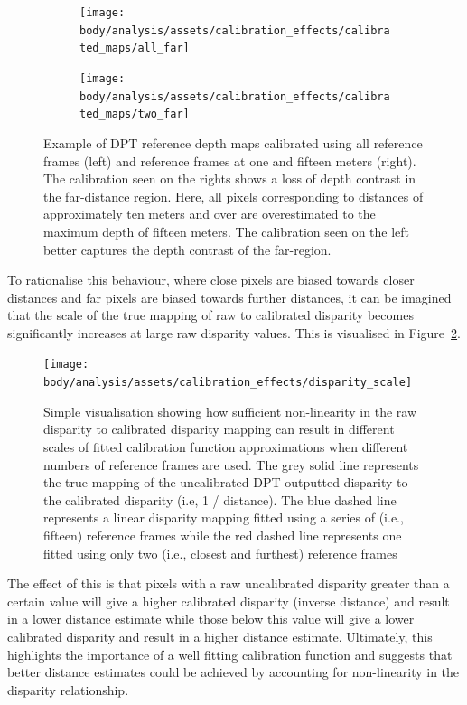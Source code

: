 \begin{figure}[H]
    \centering
    \begin{subfigure}[t]{0.48\textwidth}
        \centering
        \texttt{[image: body/analysis/assets/calibration\_effects/calibrated\_maps/all\_far]}
    \end{subfigure}
    \begin{subfigure}[t]{0.48\textwidth}
        \centering
        \texttt{[image: body/analysis/assets/calibration\_effects/calibrated\_maps/two\_far]}
    \end{subfigure}

    \caption{Example of DPT reference depth maps calibrated using all reference frames (left) and reference
        frames at one and fifteen meters (right). The calibration seen on the rights shows a loss of depth
        contrast in the far-distance region. Here, all pixels corresponding to distances of approximately ten
        meters and over are overestimated to the maximum depth of fifteen meters. The calibration seen on the
        left better captures the depth contrast of the far-region.}
    \label{fig:far_scale}
\end{figure}

To rationalise this behaviour, where close pixels are biased towards closer distances and far pixels
are biased towards further distances, it can be imagined that the scale of the true mapping of raw to
calibrated disparity becomes significantly increases at large raw disparity values.
This is visualised in Figure~\ref{fig:disparity_scale}.

\begin{figure}[H]
    \centering
    \texttt{[image: body/analysis/assets/calibration\_effects/disparity\_scale]}
    \caption{Simple visualisation showing how sufficient non-linearity in the raw disparity to calibrated
    disparity mapping can result in different scales of fitted calibration function approximations when
    different numbers of reference frames are used. The grey solid line represents the true mapping of the
    uncalibrated DPT outputted disparity to the calibrated disparity (i.e, 1 / distance). The blue dashed
    line represents a linear disparity mapping fitted using a series of (i.e., fifteen) reference frames
    while the red dashed line represents one fitted using only two (i.e., closest and furthest) reference
    frames}
    \label{fig:disparity_scale}
\end{figure}

The effect of this is that pixels with a raw uncalibrated disparity greater than a certain value
will give a higher calibrated disparity (inverse distance) and result in a lower distance estimate while
those below this value will give a lower calibrated disparity and result in a higher distance estimate.
Ultimately, this highlights the importance of a well fitting calibration function and suggests that
better distance estimates could be achieved by accounting for non-linearity in the disparity relationship.


